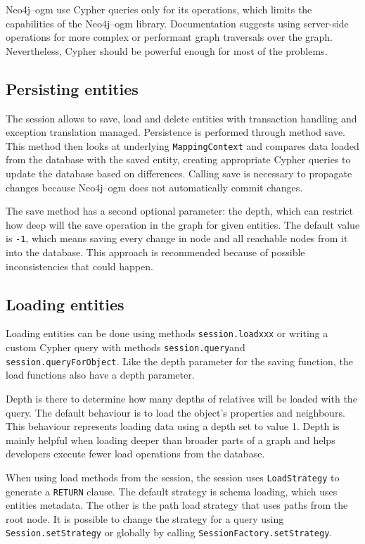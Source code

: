 Neo4j--\acrshort{ogm} use Cypher queries only for its operations, which limits the capabilities of the Neo4j--\acrshort{ogm} library.
Documentation suggests using server-side operations for more complex or performant graph traversals over the graph.
Nevertheless, Cypher should be powerful enough for most of the problems.

\subsection {Persisting entities}

The session allows to save, load and delete entities with transaction handling and exception translation managed.
Persistence is performed through method save. This method then looks at underlying \texttt{MappingContext} and compares data loaded
from the database with the saved entity, creating appropriate Cypher queries to update the database based on differences.
Calling save is necessary to propagate changes because Neo4j--\acrshort{ogm} does not automatically commit changes.

The save method has a second optional parameter: the depth, which can restrict how deep will the save operation in the graph for given entities.
The default value is \texttt{-1}, which means saving every change in node and all reachable nodes from it into the database.
This approach is recommended because of possible inconsistencies that could happen.

\subsection {Loading entities}

Loading entities can be done using methods \texttt{session.loadxxx} or writing a custom Cypher query with methods \texttt{session.query}\linebreak and \texttt{session.queryForObject}.
Like the depth parameter for the saving function, the load functions also have a depth parameter.

Depth is there to determine how many depths of relatives will be loaded with the query.
The default behaviour is to load the object's properties and neighbours.
This behaviour represents loading data using a depth set to value 1.
Depth is mainly helpful when loading deeper than broader parts of a graph and helps developers execute fewer load operations from the database.

When using load methods from the session, the session uses \texttt{LoadStrategy} to generate a \texttt{RETURN} clause. The default strategy is schema loading,
which uses entities metadata. The other is the path load strategy that uses paths from the root node. It is possible to change the strategy for a query using \texttt{Session.setStrategy}
or globally by calling \texttt{SessionFactory.setStrategy}.

